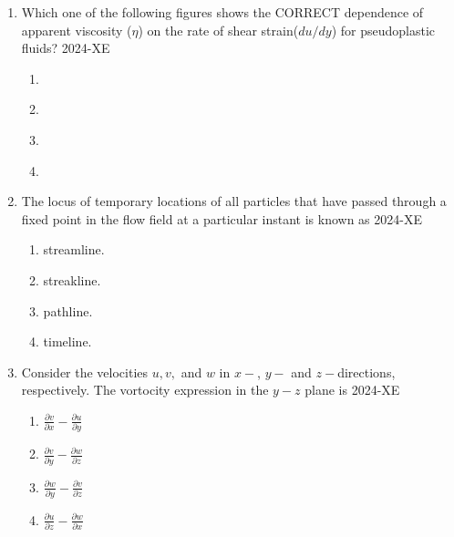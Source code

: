 \documentclass[journal,12pt,onecolumn]{IEEEtran}
\theoremstyle{remark}
\begin{document}
\begin{enumerate}
	\item Which one of the following figures shows the CORRECT dependence of apparent viscosity ($\eta$) on the rate of shear strain($du/dy$) for pseudoplastic fluids?
	\hfill{2024-XE}

		\begin{enumerate}
			\item %
				\begin{figure}[ht]
					
				\end{figure}
			\item %
				\begin{figure}[ht]
					
				\end{figure}

			\item %
				\begin{figure}[ht]
					
				\end{figure}

			\item %
				\begin{figure}[ht]
					
				\end{figure}

		\end{enumerate}

	\item The locus of temporary locations of all particles that have passed through a fixed point in the flow field at a particular instant is known as 
	\hfill{2024-XE}

		\begin{enumerate}
			\item streamline.
			\item streakline.
			\item pathline.
			\item timeline.
		\end{enumerate}
		
	\item Consider the velocities $u,v,$ and $w$ in $x-$, $y-$ and $z-$directions, respectively. The vortocity expression in the $y-z$ plane is
	\hfill{2024-XE}

		\begin{enumerate}
			\item $\frac{\partial v}{\partial x}-\frac{\partial u}{\partial y}$
			\item $\frac{\partial v}{\partial y}-\frac{\partial w}{\partial z}$
			\item $\frac{\partial w}{\partial y}-\frac{\partial v}{\partial z}$
			\item $\frac{\partial u}{\partial z}-\frac{\partial w}{\partial x}$
		\end{enumerate}


\end{enumerate}
\end{document}

